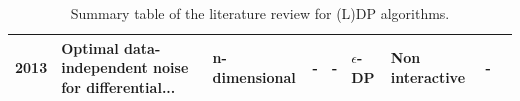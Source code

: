 \begin{landscape}
\begin{table}[ht]
\begin{tabular}{rllllllll}
      2013 \citep{geng_optimal_2013}      & Optimal data-independent noise for differential... & n-dimensional                                      & -       & -                                                  & $\epsilon$-DP  & Non interactive             & -                                      \\
      \bottomrule
    \end{tabular}
    \caption{Summary table of the literature review for (L)DP algorithms.}
    \label{tab:summary_table_dp}
  \end{table}
\end{landscape}

